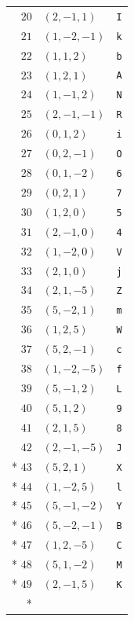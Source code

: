 \documentclass[aps,pra,reprint,superscriptaddress,longbibliography,nofootinbib,floatfix,10pt]{revtex4-2}
\theoremstyle{definition}
\begin{document}
\begin{longtable}{rll}
$20$ & $(2,-1,1)$ & \texttt{I}\\
$21$ & $(1,-2,-1)$ & \texttt{k}\\
$22$ & $(1,1,2)$ & \texttt{b}\\
$23$ & $(1,2,1)$ & \texttt{A}\\
$24$ & $(1,-1,2)$ & \texttt{N}\\
$25$ & $(2,-1,-1)$ & \texttt{R}\\
$26$ & $(0,1,2)$ & \texttt{i}\\
$27$ & $(0,2,-1)$ & \texttt{O}\\
$28$ & $(0,1,-2)$ & \texttt{6}\\
$29$ & $(0,2,1)$ & \texttt{7}\\
$30$ & $(1,2,0)$ & \texttt{5}\\
$31$ & $(2,-1,0)$ & \texttt{4}\\
$32$ & $(1,-2,0)$ & \texttt{V}\\
$33$ & $(2,1,0)$ & \texttt{j}\\
$34$ & $(2,1,-5)$ & \texttt{Z}\\
$35$ & $(5,-2,1)$ & \texttt{m}\\
$36$ & $(1,2,5)$ & \texttt{W}\\
$37$ & $(5,2,-1)$ & \texttt{c}\\
$38$ & $(1,-2,-5)$ & \texttt{f}\\
$39$ & $(5,-1,2)$ & \texttt{L}\\
$40$ & $(5,1,2)$ & \texttt{9}\\
$41$ & $(2,1,5)$ & \texttt{8}\\
$42$ & $(2,-1,-5)$ & \texttt{J}\\*
$43$ & $(5,2,1)$ & \texttt{X}\\*
$44$ & $(1,-2,5)$ & \texttt{l}\\*
$45$ & $(5,-1,-2)$ & \texttt{Y}\\*
$46$ & $(5,-2,-1)$ & \texttt{B}\\*
$47$ & $(1,2,-5)$ & \texttt{C}\\*
$48$ & $(5,1,-2)$ & \texttt{M}\\*
$49$ & $(2,-1,5)$ & \texttt{K}\\*
\end{longtable}
\endgroup
\begingroup\small
{}
\end{document}
